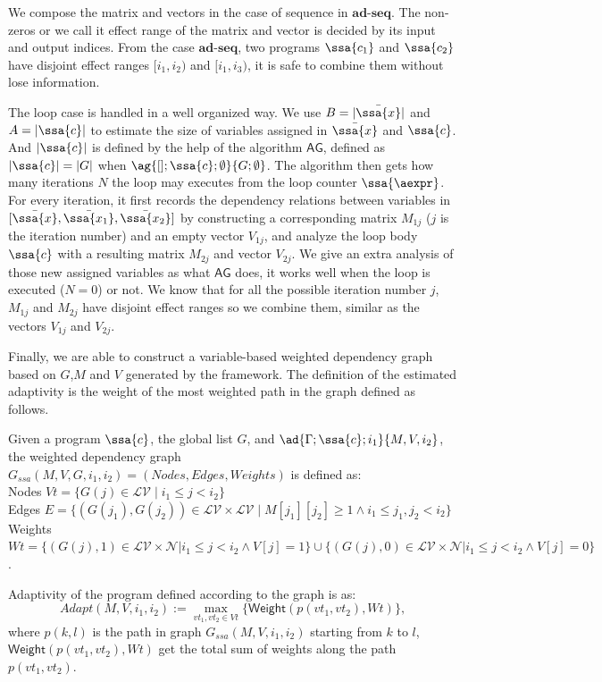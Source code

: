 We compose the matrix and vectors in the case of sequence in $\textbf{ad-seq}$. The non-zeros or we call it effect range of the matrix and vector is decided by its input and output indices. From the case $\textbf{ad-seq}$, two programs $\ssa{c_1}$ and $\ssa{c_2}$ have disjoint effect ranges $[i_1, i_2)$ and $[i_1,i_3)$, it is safe to combine them without lose information. 

The loop case is handled in a well organized way. We use $B= |\bar{\ssa{x}}|$ and $A= |{\ssa{c}}|$ to estimate the size of variables assigned in $\bar{\ssa{x}}$ and $\ssa{c}$. And  $|\ssa{c}|$ is defined by the help of the algorithm $\mathsf{AG}$, defined as $|\ssa{c}|= |G|$ when $\ag{[];\ssa{c};\emptyset }{ G; \emptyset }$. The algorithm then gets how many iterations $N$ the loop may executes from the loop counter $\ssa{\aexpr}$. For every iteration, it first records the dependency relations between variables in $ [\bar{\ssa{x}}, \bar{\ssa{x_1}}, \bar{\ssa{x_2}}]$ by constructing a corresponding matrix $M_{1j}$ ($j$ is the iteration number) and an empty vector $V_{1j}$, and analyze the loop body $\ssa{c}$ with a resulting matrix $M_{2j}$ and vector $V_{2j}$. We give an extra analysis of those new assigned variables as what $\mathsf{AG}$ does, it works well when the loop is executed ($N = 0$) or not. We know that for all the possible iteration number $j$, $M_{1j}$ and $M_{2j}$ have disjoint effect ranges so we combine them, similar as the vectors $V_{1j}$ and $V_{2j}$.   

Finally, we are able to construct a variable-based weighted dependency graph based on $G$,$M$ and $V$ generated by the framework. The definition of the estimated adaptivity is the weight of the most weighted path in the graph defined as follows. 

\begin{defn}
Given a program $\ssa{c}$, the global list $G$, and $\ad{\Gamma; \ssa{c}; i_1}{M, V, i_2}$, the weighted dependency graph $G_{ssa}(M, V,G,i_1,i_2) = (Nodes, Edges, Weights)$ is defined as:
\\
Nodes $Vt = \{ G(j) \in \mathcal{LV} \mid i_1 \leq j < i_2 \}$
\\
Edges $E = \{ (G(j_1), G(j_2)) \in \mathcal{LV} \times \mathcal{LV} \mid M[j_1][j_2] \geq 1 \land  i_1 \leq j_1,j_2 < i_2   \}$
\\
 Weights $Wt = \{ (  G(j), 1 ) \in \mathcal{LV} \times \mathcal{N} | i_1 \leq j < i_2 \land V[j] = 1\}
        \cup \{ (  G(j), 0 ) \in \mathcal{LV} \times \mathcal{N} | i_1 \leq j < i_2 \land V[j] = 0 \} $.
        
Adaptivity of the program defined according to the graph is as:
\[
Adapt(M, V,i_1,i_2) := \max_{vt_1, vt_2 \in Vt}\{ \mathsf{Weight}( p(vt_1, vt_2), Wt) \},
\]
where $p(k, l)$ is the path in graph $G_{ssa}(M, V, i_1,i_2)$ starting from $k$ to $l$, $\mathsf{Weight}(p(vt_1,vt_2), Wt)$ get the total sum of weights along the path $p(vt_1,vt_2)$.
\end{defn}        

